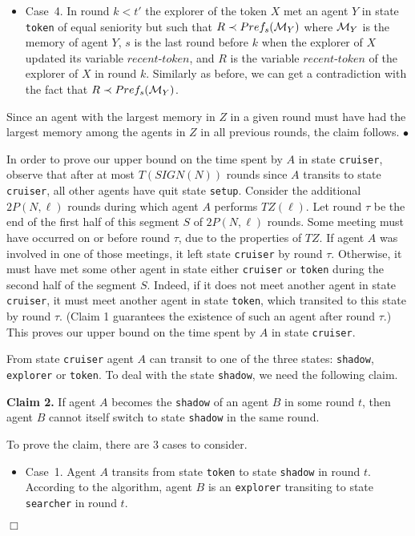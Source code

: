 \documentclass[11pt]{article}
\newcommand{\finclaim}{\hfill $\bullet$}
\newcommand{\qed}{\hfill $\Box$ \bigbreak}
\newenvironment{proof}{\noindent {\bf Proof.}}{\qed}
\newcommand{\cM}{{\cal M}}
\begin{document}
\begin{proof}
\begin{itemize}
\item{ {Case~4.} In round $k< t'$ the explorer of the token $X$ met an agent $Y$ in state {\tt token} of equal seniority but such that $R \prec Pref_s(\cM_Y)$ where $\cM_Y$ is the memory of agent $Y$, $s$ is the last round before $k$ when the explorer of $X$ updated its variable $recent$-$token$, and $R$ is the variable $recent$-$token$ of the explorer of $X$ in round $k$. Similarly as before, we can get a contradiction with the fact that $R \prec Pref_s(\cM_Y)$.}

\end{itemize}

Since an agent with the largest memory {in $Z$} in a given round must have had the largest memory among the agents in $Z$ in all previous rounds, the claim follows. \finclaim

In order to prove our upper bound on the time spent by $A$ in state {\tt cruiser}, observe that
after at most {$T(SIGN(N))$ rounds} since $A$ transits to state {\tt cruiser}, all other agents have quit state {\tt setup}. 
Consider the additional $2P(N,\ell)$ rounds during which agent $A$ performs $TZ(\ell)$. Let round $\tau$ be the end of the first half
of this segment $S$ of  $2P(N,\ell)$ rounds. Some meeting must have occurred on or before round $\tau$, due to the properties of $TZ$.
If agent $A$ was involved in one of those meetings, it left state {\tt cruiser} by round $\tau$. Otherwise, it must have met some other agent
in state either {\tt cruiser} or {\tt token} during the second half of the segment $S$. Indeed, if it does not meet another agent in state {\tt cruiser},
it must meet another agent in state {\tt token}, which transited to this state by round $\tau$. (Claim 1 guarantees the existence of such an 
agent after round $\tau$.) This proves our upper bound on the time spent by $A$ in state {\tt cruiser}.

From state {\tt cruiser} agent $A$ can transit to one of the three states: {\tt shadow}, {\tt explorer} or {\tt token}. {To deal with the state {\tt shadow}, we need the following claim.}

\vspace*{0.3cm}
\noindent
{{\bf Claim 2.} If agent $A$ becomes the {\tt shadow} of an agent $B$ in some round $t$, then agent $B$ cannot itself switch to state {\tt shadow} in the same round.}


{To prove the claim, there are $3$ cases to consider.}

\begin{itemize}
\item{ {Case~1.} Agent $A$ transits from state {\tt token} to state {\tt shadow} in round $t$. According to the algorithm, agent $B$ is an 
{\tt explorer} transiting to state {\tt searcher} in round $t$.}


\end{itemize}
\end{proof}
\end{document}
